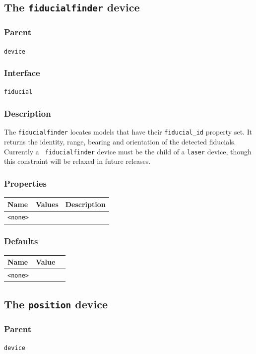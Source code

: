 \documentclass[11pt,twoside]{report}
\begin{document}
\newpage
\subsection{The {\tt fiducialfinder} device}

\subsubsection*{Parent}
{\tt device}

\subsubsection*{Interface}
{\tt fiducial}

\subsubsection*{Description}

The \verb'fiducialfinder' locates models that have their
\verb'fiducial_id' property set. It returns the identity, range,
bearing and orientation of the detected fiducials.  Currently a {\tt
fiducialfinder} device must be the child of a {\tt laser} device,
though this constraint will be relaxed in future releases.

\subsubsection*{Properties}
\begin{tabularx}{\columnwidth}{llX}
\hline
Name & Values & Description \\
\hline
\verb'<none>'\\
\hline
\end{tabularx}

\subsubsection*{Defaults}
\begin{tabularx}{\columnwidth}{llX}
\hline
Name & Value\\
\hline
\verb'<none>'\\
\hline
\end{tabularx}


\newpage
\subsection{The {\tt position} device}

\subsubsection*{Parent}
{\tt device}
\end{document}
